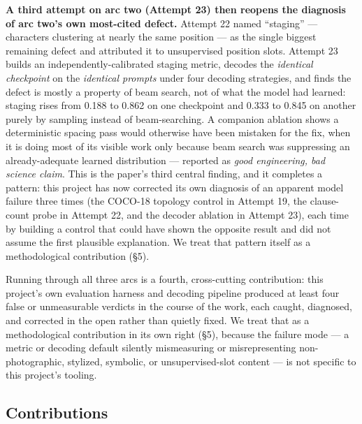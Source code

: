 \documentclass[11pt]{article}
\newcommand{\secsym}{\S}
\begin{document}
\textbf{A third attempt on arc two (Attempt 23) then reopens the diagnosis
of arc two's own most-cited defect.} Attempt 22 named ``staging'' ---
characters clustering at nearly the same position --- as the single
biggest remaining defect and attributed it to unsupervised position
slots. Attempt 23 builds an independently-calibrated staging metric,
decodes the \emph{identical checkpoint} on the \emph{identical prompts}
under four decoding strategies, and finds the defect is mostly a property
of beam search, not of what the model had learned: staging rises from
0.188 to 0.862 on one checkpoint and 0.333 to 0.845 on another purely by
sampling instead of beam-searching. A companion ablation shows a
deterministic spacing pass would otherwise have been mistaken for the
fix, when it is doing most of its visible work only because beam search
was suppressing an already-adequate learned distribution --- reported as
\emph{good engineering, bad science claim}. This is the paper's third
central finding, and it completes a pattern: this project has now
corrected its own diagnosis of an apparent model failure three times (the
COCO-18 topology control in Attempt 19, the clause-count probe in Attempt
22, and the decoder ablation in Attempt 23), each time by building a
control that could have shown the opposite result and did not assume the
first plausible explanation. We treat that pattern itself as a
methodological contribution (\secsym5).

Running through all three arcs is a fourth, cross-cutting contribution:
this project's own evaluation harness and decoding pipeline produced at
least four false or unmeasurable verdicts in the course of the work, each
caught, diagnosed, and corrected in the open rather than quietly fixed. We
treat that as a methodological contribution in its own right (\secsym5),
because the failure mode --- a metric or decoding default silently
mismeasuring or misrepresenting non-photographic, stylized, symbolic, or
unsupervised-slot content --- is not specific to this project's tooling.

\subsection*{Contributions}
\end{document}
